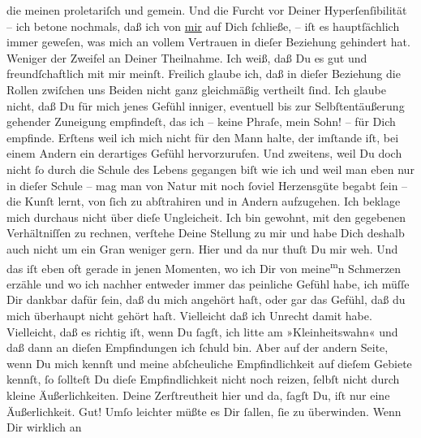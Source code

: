 \begin{ledgroupsized}[t]{13cm}
               die meinen proletariſch und gemein. Und {\pb}die Furcht
               vor Deiner Hyperſenſibilität – ich betone nochmals, daß ich von \uline{mir} auf Dich ſchließe, – iſt es hauptſächlich immer
               geweſen, was mich an vollem Vertrauen in dieſer Beziehung gehindert hat. Weniger der
               Zweifel an Deiner Theilnahme. Ich weiß, daß Du es gut und freundſchaftlich mit mir
               meinſt. Freilich glaube ich, daß in dieſer Beziehung die Rollen zwiſchen uns Beiden
               nicht ganz gleichmäßig vertheilt ſind. Ich glaube nicht, daß Du für mich jenes Gefühl
               inniger, eventuell bis zur Selbſtentäußerung gehender Zuneigung empfindeſt, das ich –
               keine Phraſe, mein Sohn! – für Dich empfinde. Erſtens weil ich mich nicht für den
               Mann halte, der imſtande iſt, bei einem Andern  ein derartiges Gefühl hervorzurufen. {\pb}Und
               zweitens, weil Du doch nicht ſo durch die Schule des Lebens gegangen biſt wie ich und
               weil man eben nur in dieſer Schule – mag man von Natur mit noch ſoviel Herzensgüte
               begabt ſein – die Kunſt lernt, von ſich zu abſtrahiren und in Andern aufzugehen. Ich
               beklage mich durchaus nicht über dieſe Ungleicheit. Ich bin gewohnt, mit den
               gegebenen Verhältniſſen zu rechnen, verſtehe Deine Stellung zu mir und habe Dich
               deshalb auch nicht um ein\strikeout{\textcolor{gray}{en}} Gran weniger {\pb}gern. Hier und da nur thuſt Du
               mir weh. Und das iſt eben oft gerade in jenen Momenten,  wo ich Dir von meine\substVorne{}\textsuperscript{m}\substDazwischen{}n\substHinten{} Schmerzen erzähle und wo ich nachher entweder immer das peinliche Gefühl
               habe, ich müſſe Dir dankbar dafür ſein, daß du mich angehört haſt, oder gar das
               Gefühl, daß du mich überhaupt nicht gehört haſt. Vielleicht daß ich Unrecht damit
               habe. Vielleicht, daß es richtig iſt, wenn Du ſagſt, ich litte am »Kleinheitswahn«
               und daß dann an dieſen Empfindungen ich ſchuld bin. Aber auf der andern Seite, wenn
               Du mich kennſt und meine abſcheuliche Empfindlichkeit auf dieſem Gebiete kennſt, ſo
               ſollteſt Du dieſe Empfindlichkeit nicht noch reizen,  ſelbſt nicht durch kleine Äußerlichkeiten. Deine Zerſtreutheit {\pb}hier und da, ſagſt Du, iſt nur eine Äußerlichkeit.
               Gut! Umſo leichter müßte es Dir ſallen, ſie zu überwinden. Wenn Dir wirklich an

\end{ledgroupsized}
